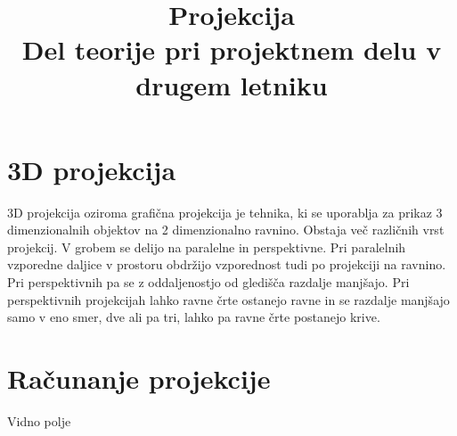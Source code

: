 \documentclass[a4paper, 12px]{article}
\title{Projekcija \\[1ex] \large Del teorije pri projektnem delu v drugem letniku}
\begin{document}
\maketitle

\section{3D projekcija}
    3D projekcija oziroma grafična projekcija je tehnika, ki se uporablja za prikaz 3 dimenzionalnih objektov na 
    2 dimenzionalno ravnino. Obstaja več različnih vrst projekcij. V grobem se delijo na paralelne 
    in perspektivne. Pri paralelnih vzporedne daljice v prostoru obdržijo vzporednost tudi po 
    projekciji na ravnino. Pri perspektivnih pa se z oddaljenostjo od gledišča razdalje manjšajo.
    Pri perspektivnih projekcijah lahko ravne črte ostanejo ravne in se razdalje manjšajo samo v 
    eno smer, dve ali pa tri, lahko pa ravne črte postanejo krive.
    \cite{3D-projection}

\section{Računanje projekcije}
    Vidno polje \\

\printbibliography
\end{document}
